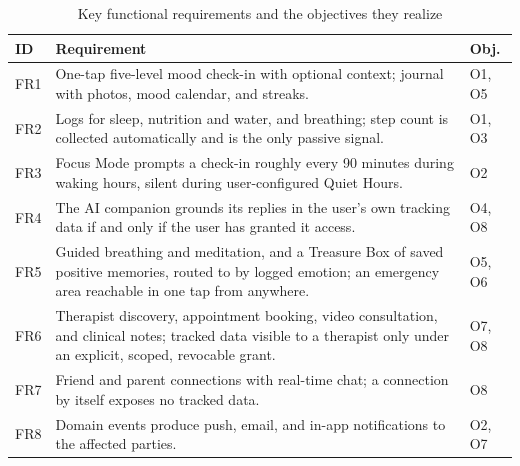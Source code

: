 \begin{table}[htbp]
  \centering
  \caption{Key functional requirements and the objectives they realize}
  \label{tab:freq}
  \begin{tabular}{|l|p{8.2cm}|l|}
    \hline
    \textbf{ID} & \textbf{Requirement} & \textbf{Obj.} \\
    \hline
    FR1 & One-tap five-level mood check-in with optional context; journal
          with photos, mood calendar, and streaks. & O1, O5 \\
    \hline
    FR2 & Logs for sleep, nutrition and water, and breathing; step count is
          collected automatically and is the only passive signal. & O1, O3 \\
    \hline
    FR3 & Focus Mode prompts a check-in roughly every 90 minutes during
          waking hours, silent during user-configured Quiet Hours. & O2 \\
    \hline
    FR4 & The AI companion grounds its replies in the user's own tracking
          data if and only if the user has granted it access. & O4, O8 \\
    \hline
    FR5 & Guided breathing and meditation, and a Treasure Box of saved
          positive memories, routed to by logged emotion; an emergency
          area reachable in one tap from anywhere. & O5, O6 \\
    \hline
    FR6 & Therapist discovery, appointment booking, video consultation, and
          clinical notes; tracked data visible to a therapist only under an
          explicit, scoped, revocable grant. & O7, O8 \\
    \hline
    FR7 & Friend and parent connections with real-time chat; a connection by
          itself exposes no tracked data. & O8 \\
    \hline
    FR8 & Domain events produce push, email, and in-app notifications to the
          affected parties. & O2, O7 \\
    \hline
  \end{tabular}
\end{table}

